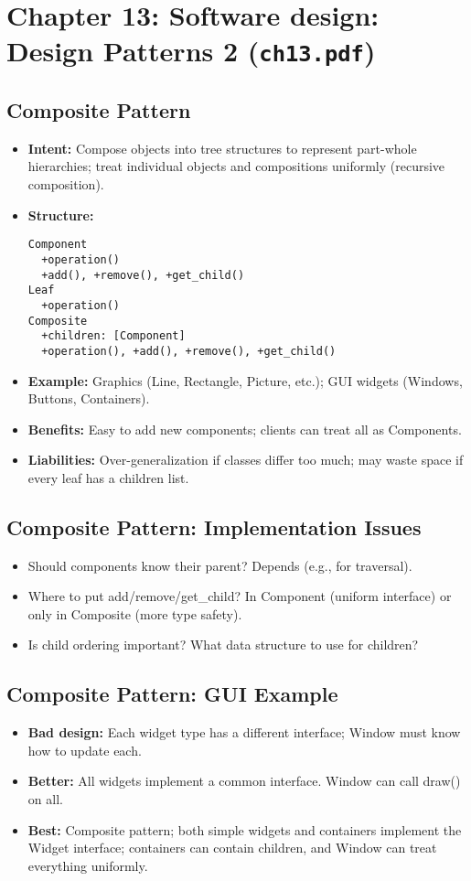 \documentclass[11pt,a4paper]{article}
\begin{document}
\section{Chapter 13: Software design: Design Patterns 2 (\texttt{ch13.pdf})}

\subsection*{Composite Pattern}
\begin{itemize}
    \item \textbf{Intent:} Compose objects into tree structures to represent part-whole hierarchies; treat individual objects and compositions uniformly (recursive composition).
    \item \textbf{Structure:}
        \begin{verbatim}
Component
  +operation()
  +add(), +remove(), +get_child()
Leaf
  +operation()
Composite
  +children: [Component]
  +operation(), +add(), +remove(), +get_child()
        \end{verbatim}
    \item \textbf{Example:} Graphics (Line, Rectangle, Picture, etc.); GUI widgets (Windows, Buttons, Containers).
    \item \textbf{Benefits:} Easy to add new components; clients can treat all as Components.
    \item \textbf{Liabilities:} Over-generalization if classes differ too much; may waste space if every leaf has a children list.
\end{itemize}

\subsection*{Composite Pattern: Implementation Issues}
\begin{itemize}
    \item Should components know their parent? Depends (e.g., for traversal).
    \item Where to put add/remove/get\_child? In Component (uniform interface) or only in Composite (more type safety).
    \item Is child ordering important? What data structure to use for children?
\end{itemize}

\subsection*{Composite Pattern: GUI Example}
\begin{itemize}
    \item \textbf{Bad design:} Each widget type has a different interface; Window must know how to update each.
    \item \textbf{Better:} All widgets implement a common interface. Window can call draw() on all.
    \item \textbf{Best:} Composite pattern; both simple widgets and containers implement the Widget interface; containers can contain children, and Window can treat everything uniformly.
\end{itemize}
\end{document}
